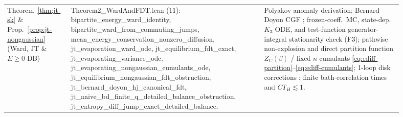\documentclass[11pt,a4paper]{article}
\theoremstyle{definition}
\theoremstyle{remark}
\newcommand{\1}{\mathbf{1}}
\newcommand{\code}[1]{{\scriptsize\ttfamily #1}}
\begin{document}
\begin{table}[!tb]
\begin{tabular}{@{}>{\raggedright\arraybackslash}p{0.15\linewidth}>{\raggedright\arraybackslash}p{0.46\linewidth}>{\raggedright\arraybackslash}p{0.33\linewidth}@{}}
Theorem~\ref{thm:jt-sk} \& Prop.~\ref{prop:jt-nongaussian} (Ward, JT \& $E\ge 0$ DB) & \code{Theorem2\_\allowbreak WardAndFDT.lean} (11): \code{bipartite\_\allowbreak energy\_\allowbreak ward\_\allowbreak identity}, \code{bipartite\_\allowbreak ward\_\allowbreak from\_\allowbreak commuting\_\allowbreak jumps}, \code{mean\_\allowbreak energy\_\allowbreak conservation\_\allowbreak nonzero\_\allowbreak diffusion}, \code{jt\_\allowbreak evaporation\_\allowbreak ward\_\allowbreak ode}, \code{jt\_\allowbreak equilibrium\_\allowbreak fdt\_\allowbreak exact}, \code{jt\_\allowbreak evaporating\_\allowbreak variance\_\allowbreak ode}, \code{jt\_\allowbreak evaporating\_\allowbreak nongaussian\_\allowbreak cumulants\_\allowbreak ode}, \code{jt\_\allowbreak equilibrium\_\allowbreak nongaussian\_\allowbreak fdt\_\allowbreak obstruction}, \code{jt\_\allowbreak bernard\_\allowbreak doyon\_\allowbreak hj\_\allowbreak canonical\_\allowbreak fdt}, \code{jt\_\allowbreak naive\_\allowbreak bd\_\allowbreak finite\_\allowbreak q\_\allowbreak detailed\_\allowbreak balance\_\allowbreak obstruction}, \code{jt\_\allowbreak entropy\_\allowbreak diff\_\allowbreak jump\_\allowbreak exact\_\allowbreak detailed\_\allowbreak balance}. & Polyakov anomaly derivation; Bernard--Doyon CGF \cite{BernardDoyon2012,BernardDoyon2015}; frozen-coeff.\ MC, state-dep.\ $K_3$ ODE, and test-function generator-integral stationarity check (F3); pathwise non-explosion and direct partition function $Z_C(\beta)$ / fixed-$n$ cumulants \eqref{eq:ediff-partition}--\eqref{eq:ediff-cumulants}; 1-loop disk corrections \cite{StanfordWitten2017}; finite bath-correlation times \cite{Gaikwad2023} and $CT_H\lesssim 1$. \\

\end{tabular}
\end{table}
\end{document}
